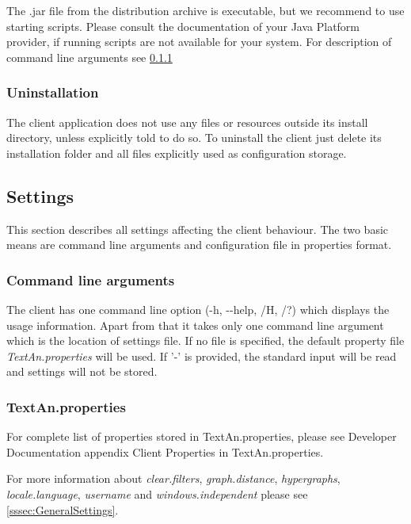 The .jar file from the distribution archive is executable,
but we recommend to use starting scripts.
Please consult the documentation of your Java Platform provider,
if running scripts are not available for your system.
For description of command line arguments see \ref{ssec:CliCmdArg}

\subsubsection{Uninstallation}

The client application does not use any files or resources outside its install
directory, unless explicitly told to do so.
To uninstall the client just delete its installation folder and all files
explicitly used as configuration storage.

\subsection{Settings}

This section describes all settings affecting the client behaviour.
The two basic means are command line arguments and configuration file in
properties format.

\subsubsection{Command line arguments}
\label{ssec:CliCmdArg}

The client has one command line option (-h, -{}-help, /H, /?) which displays the
usage information. Apart from that it takes only one command line argument
which is the location of settings file. If no file is specified, the default
property file \emph{TextAn.properties} will be used. If '-' is provided, the
standard input will be read and settings will not be stored.

\subsubsection{TextAn.properties}

For complete list of properties stored in TextAn.properties, please see
Developer Documentation appendix Client Properties in TextAn.properties.


For more information about \emph{clear.filters}, \emph{graph.distance},
\emph{hypergraphs}, \emph{locale.language}, \emph{username}
and \emph{windows.independent} please see \ref{sssec:GeneralSettings}.
